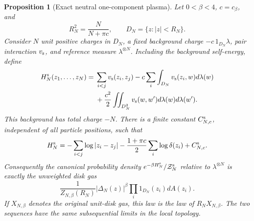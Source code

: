 \documentclass[11pt,a4paper]{article}
\numberwithin{equation}{section}
\newtheorem{proposition}[theorem]{Proposition}
\theoremstyle{definition}
\theoremstyle{remark}
\begin{document}
\begin{proposition}[Exact neutral one-component plasma]
\label{prop:exact-neutral-ocp}
Let $0<\beta<4$, $c=c_\beta$, and
\[
 R_N^2=\frac{N}{N+\pi c},\qquad D_N=\{z:|z|<R_N\}.
\]
Consider $N$ unit positive charges in $D_N$, a fixed background charge
$-c\,1_{D_N}\lambda$, pair interaction $v_{\rm s}$, and reference
measure $\lambda^{\otimes N}$.  Including the background self-energy,
define
\begin{align}
 H_{N}^{\rm s}(z_1,\ldots,z_N)
 ={}&\sum_{i<j}v_{\rm s}(z_i,z_j)
       -c\sum_i\int_{D_N}v_{\rm s}(z_i,w)d\lambda(w)
 \nonumber\\
 &+\frac{c^2}{2}\iint_{D_N^2}v_{\rm s}(w,w')
                         d\lambda(w)d\lambda(w').
 \label{eq:neutral-ocp-energy}
\end{align}
This background has total charge $-N$.
There is a finite constant $C_{N,c}^{\rm s}$, independent of all particle
positions, such that
\[
 H_N^{\rm s}
 =-\sum_{i<j}\log|z_i-z_j|
   -\frac{1+\pi c}{2}\sum_i\log\delta(z_i)+C_{N,c}^{\rm s}.
\]
Consequently the canonical probability density
$e^{-\beta H_N^{\rm s}}/\mathcal Z_N^{\rm s}$ relative to
$\lambda^{\otimes N}$ is exactly the unweighted disk gas
\[
 \frac{1}{Z_{N,\beta}(R_N)}
 |\Delta_N(z)|^\beta\prod_i1_{D_N}(z_i)dA(z_i).
 \label{eq:neutral-ocp-unweighted}
\]
If $X_{N,\beta}$ denotes the original unit-disk gas, this law is the
law of $R_NX_{N,\beta}$.  The two sequences have the same subsequential
limits in the local topology.
\end{proposition}
\end{document}
